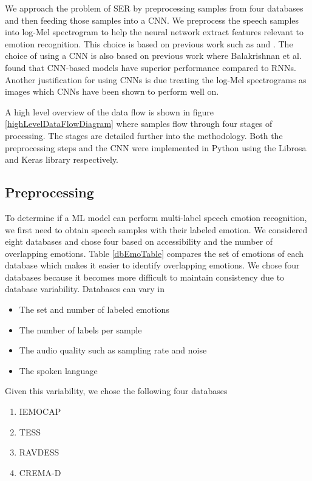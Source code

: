 \documentclass[conference]{IEEEtran}
\begin{document}
We approach the problem of SER by preprocessing samples from four databases and then feeding those samples into a CNN. We preprocess the speech samples into log-Mel spectrogram to help the neural network extract features relevant to emotion recognition. This choice is based on previous work such as \cite{Engel2019} and \cite{Badshah2017}. The choice of using a CNN is also based on previous work where Balakrishnan et al. \cite{Balakrishnan2017} found that CNN-based models have superior performance compared to RNNs. Another justification for using CNNs is due treating the log-Mel spectrograms as images which CNNs have been shown to perform well on.\cite{Krizhevsky2012}

A high level overview of the data flow is shown in figure \ref{highLevelDataFlowDiagram} where samples flow through four stages of processing. The stages are detailed further into the methodology. Both the preprocessing steps and the CNN were implemented in Python using the Librosa \cite{McFee2015} and Keras \cite{Chollet2015} library respectively.

\subsection{Preprocessing}

To determine if a ML model can perform multi-label speech emotion recognition, we first need to obtain speech samples with their labeled emotion. We considered eight databases and chose four based on accessibility and the number of overlapping emotions. Table \ref{dbEmoTable} compares the set of emotions of each database which makes it easier to identify overlapping emotions. We chose four databases because it becomes more difficult to maintain consistency due to database variability. Databases can vary in
\begin{itemize}
	\item The set and number of labeled emotions
	\item The number of labels per sample
	\item The audio quality such as sampling rate and noise
	\item The spoken language
\end{itemize}
Given this variability, we chose the following four databases
\begin{enumerate}
	\item IEMOCAP \cite{busso_2008}
	\item TESS \cite{dupuis_2011}
	\item RAVDESS \cite{livingstone_2018}
	\item CREMA-D \cite{cao_2014}
\end{enumerate}
\end{document}
